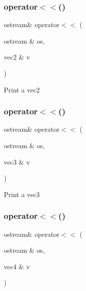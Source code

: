 \subsubsection{\texorpdfstring{operator$<$$<$()}{operator<<()}\hspace{0.1cm}{\footnotesize\ttfamily [1/4]}}
{\footnotesize\ttfamily ostream\& operator$<$$<$ (\begin{DoxyParamCaption}\item[{ostream \&}]{os,  }\item[{vec2 \&}]{v }\end{DoxyParamCaption})}

Print a vec2 \mbox{\label{cout-definitions_8cpp_a9785ea3eade9968a62d5e9836f720617}} 
\subsubsection{\texorpdfstring{operator$<$$<$()}{operator<<()}\hspace{0.1cm}{\footnotesize\ttfamily [2/4]}}
{\footnotesize\ttfamily ostream\& operator$<$$<$ (\begin{DoxyParamCaption}\item[{ostream \&}]{os,  }\item[{vec3 \&}]{v }\end{DoxyParamCaption})}

Print a vec3 \mbox{\label{cout-definitions_8cpp_aced74fdd5c32b973692a20e6272a5f56}} 
\subsubsection{\texorpdfstring{operator$<$$<$()}{operator<<()}\hspace{0.1cm}{\footnotesize\ttfamily [3/4]}}
{\footnotesize\ttfamily ostream\& operator$<$$<$ (\begin{DoxyParamCaption}\item[{ostream \&}]{os,  }\item[{vec4 \&}]{v }\end{DoxyParamCaption})}

